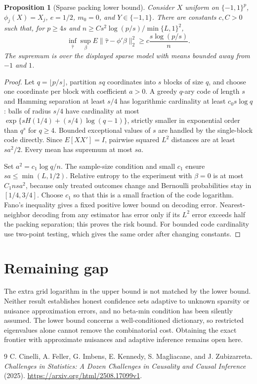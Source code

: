 \documentclass[11pt]{article}
\newtheorem{proposition}[theorem]{Proposition}
\theoremstyle{remark}
\begin{document}
\begin{proposition}[Sparse packing lower bound]
Consider $X$ uniform on $\{-1,1\}^p$, $\phi_j(X)=X_j$, $e=1/2$, $m_0=0$, and $Y\in\{-1,1\}$. There are constants $c,C>0$ such that, for $p\ge4s$ and
$n\ge C s^2\log(p/s)/\min\{L,1\}^2$,
\[
 \inf_{\widehat\tau}\sup_{\beta}
 E\|\widehat\tau-\phi'\beta\|_2^2
 \ge c\frac{s\log(p/s)}n.
\]
The supremum is over the displayed sparse model with means bounded away from $-1$ and $1$.
\end{proposition}
\begin{proof}
Let $q=\lfloor p/s\rfloor$, partition $sq$ coordinates into $s$ blocks of size $q$, and choose one coordinate per block with coefficient $a>0$. A greedy $q$-ary code of length $s$ and Hamming separation at least $s/4$ has logarithmic cardinality at least $c_0s\log q$: balls of radius $s/4$ have cardinality at most $\exp\{sH(1/4)+(s/4)\log(q-1)\}$, strictly smaller in exponential order than $q^s$ for $q\ge4$. Bounded exceptional values of $s$ are handled by the single-block code directly. Since $E[XX']=I$, pairwise squared $L^2$ distances are at least $sa^2/2$. Every mean has supremum at most $sa$.

Set $a^2=c_1\log q/n$. The sample-size condition and small $c_1$ ensure $sa\le\min(L,1/2)$. Relative entropy to the experiment with $\beta=0$ is at most $C_1nsa^2$, because only treated outcomes change and Bernoulli probabilities stay in $[1/4,3/4]$. Choose $c_1$ so that this is a small fraction of the code logarithm. Fano's inequality gives a fixed positive lower bound on decoding error. Nearest-neighbor decoding from any estimator has error only if its $L^2$ error exceeds half the packing separation; this proves the risk bound. For bounded code cardinality use two-point testing, which gives the same order after changing constants.
\end{proof}

\section*{Remaining gap}
The extra grid logarithm in the upper bound is not matched by the lower bound. Neither result establishes honest confidence sets adaptive to unknown sparsity or nuisance approximation errors, and no beta-min condition has been silently assumed. The lower bound concerns a well-conditioned dictionary, so restricted eigenvalues alone cannot remove the combinatorial cost. Obtaining the exact frontier with approximate nuisances and adaptive inference remains open here.

\begin{thebibliography}{9}
 C. Cinelli, A. Feller, G. Imbens, E. Kennedy, S. Magliacane, and J. Zubizarreta. \emph{Challenges in Statistics: A Dozen Challenges in Causality and Causal Inference} (2025). \url{https://arxiv.org/html/2508.17099v1}.
\end{thebibliography}
\end{document}
